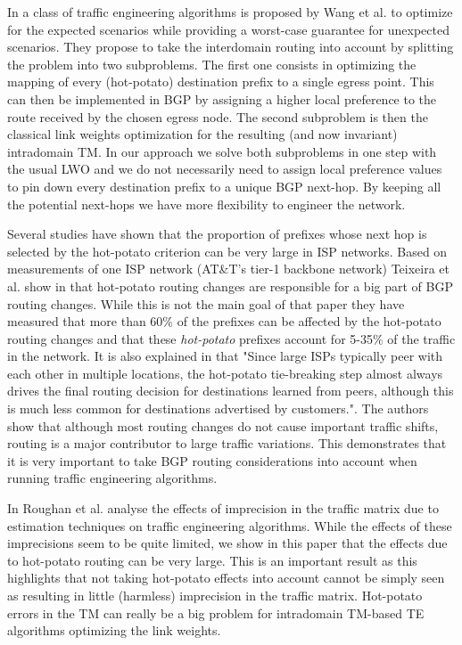 \documentclass{acm_proc_article-sp}
\begin{document}
In \cite{cope} a class of traffic engineering
algorithms is proposed by Wang et al. to optimize for the expected scenarios while providing a
worst-case guarantee for unexpected scenarios. They propose to
take the interdomain routing into account by splitting the problem into
two subproblems. The first one consists in optimizing the mapping of every (hot-potato) 
destination prefix to a single egress point. 
This can then be implemented in BGP by assigning a higher local preference 
to the route received by the chosen egress node.
The second subproblem is then the classical link weights optimization 
for the resulting (and now invariant) intradomain TM. In our approach we solve 
both subproblems in one step with the usual LWO and
we do not necessarily need to assign local preference values to
pin down every destination prefix to a unique BGP next-hop. 
By keeping all the potential next-hops we have more flexibility to engineer the network.

Several studies have shown that the proportion of prefixes whose next hop is
selected by the hot-potato criterion can be very large in ISP networks.
Based on measurements of one ISP network (AT\&T's tier-1 backbone
network) Teixeira et al. show in \cite{teixeira1} that
hot-potato routing changes are responsible for a big part of BGP
routing changes. While this is not the main goal of that paper they
have measured that more than 60\% of the prefixes can be affected by
the hot-potato routing changes and that these {\it hot-potato}
prefixes account for 5-35\% of the traffic in the network.
It is also explained in \cite{teixeira3} that "Since large ISPs
typically peer with each other in multiple locations, the hot-potato
tie-breaking step almost always drives the final routing decision for
destinations learned from peers, although this is much less common for
destinations advertised by customers.". The authors show that although
most routing changes do not cause important traffic shifts, routing is
a major contributor to large traffic variations. This demonstrates that
it is very important to take BGP routing considerations into account
when running traffic engineering algorithms.

In \cite{roughan2003} Roughan et al. analyse the effects of
  imprecision in the traffic matrix due to estimation techniques on traffic
  engineering algorithms. While the effects of these imprecisions
  seem to be quite limited, we show in this paper that the
  effects due to hot-potato routing can be very large. This is an
  important result as this highlights that not taking hot-potato
  effects into account cannot be simply seen as resulting in little
  (harmless) imprecision in the traffic matrix. Hot-potato errors
  in the TM can really be a big problem for intradomain TM-based TE
  algorithms optimizing the link weights.
\end{document}
